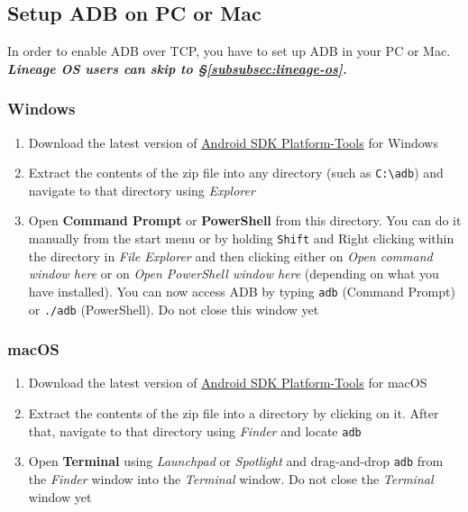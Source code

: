 \subsection{Setup ADB on PC or Mac}\label{subsec:setup-adb-on-pc-or-mac}
In order to enable ADB over TCP, you have to set up ADB in your PC or Mac. \textbf{\textit{Lineage OS users can skip to
§\cref{subsubsec:lineage-os}.}}

\subsubsection{Windows}
\begin{enumerate}
    \item Download the latest version of
    \href{https://dl.google.com/android/repository/platform-tools-latest-windows.zip}{Android SDK Platform-Tools} for
    Windows
    \item Extract the contents of the zip file into any directory (such as \texttt{C:\textbackslash{adb}}) and navigate
    to that directory using \textit{Explorer}
    \item Open \textbf{Command Prompt} or \textbf{PowerShell} from this directory. You can do it manually from the start
    menu or by holding \texttt{Shift} and Right clicking within the directory in \textit{File Explorer} and then
    clicking either on \textit{Open command window here} or on \textit{Open PowerShell window here} (depending on
    what you have installed). You can now access ADB by typing \texttt{adb} (Command Prompt) or \texttt{./adb}
    (PowerShell). Do not close this window yet
\end{enumerate}

\subsubsection{macOS}
\begin{enumerate}
    \item Download the latest version of
    \href{https://dl.google.com/android/repository/platform-tools-latest-darwin.zip}{Android SDK Platform-Tools} for
    macOS
    \item Extract the contents of the zip file into a directory by clicking on it. After that, navigate to that
    directory using \textit{Finder} and locate \texttt{adb}
    \item Open \textbf{Terminal} using \textit{Launchpad} or \textit{Spotlight} and drag-and-drop \texttt{adb} from the
    \textit{Finder} window into the \textit{Terminal} window. Do not close the \textit{Terminal} window yet
\end{enumerate}

